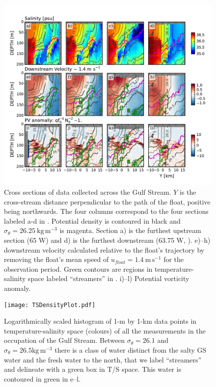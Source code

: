 \documentclass[draft,grl]{agutex2015}
\begin{document}
\begin{article}
\begin{figure}[htbp]
  \centering
    \includegraphics[width=\textwidth]{./SalDFirstStreamer.pdf}
    \caption{Cross sections of data collected across the Gulf Stream.   $Y$ is the cross-stream distance perpendicular to the path of the float, positive being northwards.  The four columns correspond to the  four sections labeled a-d in . Potential density is contoured in black and $\sigma_{\theta}=26.25\ \mathrm{kg\,m^{-3}}$ is magenta.  Section a) is the furthest upstream section (65 W) and d) is the furthest downstream (63.75 W, ).  e)--h) downstream velocity calculated relative to the float's trajectory by removing the float's mean speed of $u_{float}=1.4\ \mathrm{m\,s^{-1}}$ for the observation period.   Green contours are regions in temperature-salinity space labeled ``streamers'' in .  i)--l) Potential vorticity anomaly.  
 } \label{fig:SalDFirstStreamer}
\end{figure}

\begin{figure}[htbp]
  \centering
    \texttt{[image: TSDensityPlot.pdf]}
    \caption{Logarithmically scaled histogram of 1-m by 1-km data points in temperature-salinity space (colours) of all the measurements in the occupation of the Gulf Stream.  Between $\sigma_{\theta}=26.1$ and $\sigma_{\theta}=26.5 \mathrm{kg\,m^{-3}}$ there is a class of water distinct from the salty GS water and the fresh water to the north, that we label ``streamers'' and delineate with a green box in T/S space.  This water is contoured in green in e--l.}\label{fig:TSDensityPlot}
\end{figure}


\end{article}
\end{document}
